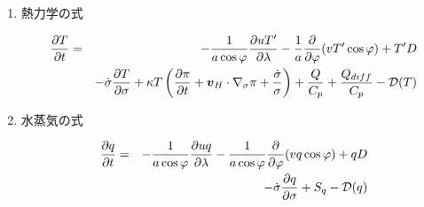 \begin{enumerate}
\item 熱力学の式

\begin{eqnarray}
\label{熱力}
  \frac{\partial T}{\partial t}
    & = & - \frac{1}{a\cos\varphi}
               \frac{\partial uT'}{\partial \lambda}
          - \frac{1}{a}
               \frac{\partial }{\partial \varphi} ( vT' \cos\varphi )
          + T' D \nonumber \\
    &   & - \dot{\sigma} 
              \frac{\partial T }{\partial \sigma}
          + \kappa T \left( \frac{\partial \pi}{\partial t}
                            + \Dvect{v}_{H} \cdot \nabla_{\sigma} \pi 
                            + \frac{ \dot{\sigma} }{ \sigma } 
                     \right)
          + \frac{Q}{C_{p}}
          + \frac{Q_{diff}}{C_{p}}
          - {\cal D}(T) 
\end{eqnarray}


\item 水蒸気の式

\begin{eqnarray}
\label{水蒸気}
  \frac{\partial q}{\partial t}
  & = & - \frac{1}{a\cos\varphi}
               \frac{\partial uq}{\partial \lambda}
          - \frac{1}{a\cos\varphi}
               \frac{\partial }{\partial \varphi} (vq \cos\varphi)
          + q D \nonumber \\
    &   & - \dot{\sigma} \frac{\partial q }{\partial \sigma}
          + S_{q}
          - {\cal D}(q) 
\end{eqnarray}

\end{enumerate}

